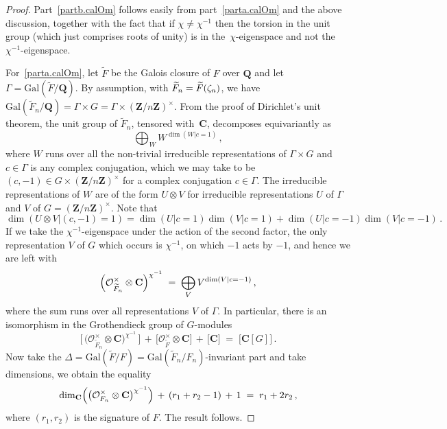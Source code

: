 \documentclass[12pt,reqno]{amsart}
\theoremstyle{definition}
\def\+{\,+\,}
\def\={\;=\;}
\def\Q{\mathbf Q}   %
\def\Z{\mathbf Z}   %
\def\C{\mathbf C}   %
\def\wF{\widetilde{F}}
\def\nn{n}
\def\wF{\widetilde{F}}
\def\Gal{\mathrm{Gal}}
\def\OL{\mathcal{O}}
\begin{document}
\begin{proof}
Part~\ref{partb.calOm} follows easily from part~\ref{parta.calOm} and the above discussion, together 
with the fact that if $\chi \neq \chi^{-1}$ then the torsion in the unit 
group (which just comprises roots of unity) is in the~$\chi$-eigenspace 
and not the~$\chi^{-1}$-eigenspace.

For~\ref{parta.calOm}, let $\wF$ be the Galois closure of $F$ over $\Q$ and let 
$\Gamma=\Gal(\wF/\Q)$. By assumption, with $\wF_\nn=\wF(\z_\nn)$, we have 
$\Gal(\wF_\nn/\Q)=\Gamma\times G=\Gamma\times \left(\Z/\nn\Z\right)^\times$.
From the proof of Dirichlet's unit theorem, the unit group of $\wF_\nn$, 
tensored with~$\C$, decomposes equivariantly as
$$
\bigoplus_{W} W^{\dim(W|c=1)}\,,
$$
where $W$ runs over all the non-trivial irreducible representations of 
$\Gamma \times G$ and $c \in \Gamma$ is any complex conjugation, which we may
take to be $(c,-1) \in G \times \left(\Z/\nn\Z\right)^\times$ for a complex
conjugation $c \in \Gamma$. The irreducible representations of $W$ are of
the form $U \otimes V$ for irreducible representations $U$ of $\Gamma$
and $V$ of $G=\left(\Z/\nn\Z\right)^\times$. Note that
$$
\dim(U \otimes V|(c,-1)=1)=\dim(U|c=1)\dim(V|c=1)+
\dim(U|c=-1)\dim(V|c=-1)\,.
$$
If we take the $\chi^{-1}$-eigenspace under the action of the second factor,
the only representation $V$ of $G$ which occurs is $\chi^{-1}$, on which $-1$ 
acts by $-1$, and hence we are left with
$$
\Bigl(\OL_{\wF_\nn}^\times \otimes\C\Bigr)^{\chi^{-1}} \=
\bigoplus_V V^{\dim(V|c=-1)}\,,
$$
where the sum runs over all representations $V$ of $\Gamma$. In particular,
there is an isomorphism in the Grothendieck group of $G$-modules
$$
\bigl[\,\bigl(\OL_{\wF_\nn}^\times \otimes\C\bigr)^{\chi^{-1}}\,\bigr] \+
\bigl[ \OL_{\wF}^\times \otimes\C \bigr] \+ \bigl[ \C \bigr] 
\= \bigl[\C[G]\bigr] \,.
$$
Now take the $\Delta=\Gal(\wF/F)=\Gal(\wF_\nn/F_\nn)$-invariant part and take
dimensions, we obtain the equality
$$
\dim_\C \Bigl(\bigl(\OL_{F_\nn}^\times \otimes\C\bigr)^{\chi^{-1}} \Bigr) 
\+ (r_1+r_2-1) \+ 1\=r_1+2r_2 \,,
$$
where $(r_1,r_2)$ is the signature of $F$. The result follows.
\end{proof}


 



 


 
 
\end{document}
